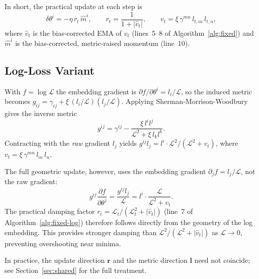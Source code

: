 \documentclass{article}
\newcommand{\loss}{\mathcal{L}}
\newcommand{\vecb}[1]{\boldsymbol{#1}}
\begin{document}
\noindent
In short, the practical update at each step is
\begin{equation}\label{eq:fixed-update}
    \delta\theta^i = -\eta\,r_t\,\hat{m}^i, \qquad
    r_t = \frac{1}{1 + |\hat{v}_t|}, \qquad
    v_t = \xi\,\gamma^{mn}\,l_{t,m}\,l_{t,n},
\end{equation}
where $\hat{v}_t$ is the bias-corrected EMA of $v_t$
(lines~5--8 of Algorithm~\ref{alg:fixed})
and $\hat{m}^i$ is the bias-corrected, metric-raised momentum (line~10).

\subsection{Log-Loss Variant}

\begin{tcolorbox}[colback=gray!8, colframe=gray!22, breakable, title=\textbf{Log-Loss Derivation Sketch}, coltitle=black]
    With $f = \log\loss$ the embedding gradient is $\partial f/\partial\theta^i = l_i/\loss$,
    so the induced metric becomes
    $g_{ij} = \gamma_{ij} + \xi\,(l_i/\loss)(l_j/\loss)$.
    Applying Sherman-Morrison-Woodbury gives the inverse metric
    $$
        g^{ij} = \gamma^{ij} - \frac{\xi\,l^i l^j}{\loss^2 + \xi\,l_k l^k}.
    $$
    Contracting with the \emph{raw} gradient $l_j$ yields
    $g^{ij}l_j = l^i \cdot \loss^2/(\loss^2 + v_t)$,
    where $v_t = \xi\,\gamma^{mn}\,l_m\,l_n$.

    \medskip\noindent
    The full geometric update, however, uses the embedding gradient
    $\partial_j f = l_j/\loss$, not the raw gradient:
    $$
        g^{ij}\frac{\partial f}{\partial\theta^j}
        = \frac{g^{ij}l_j}{\loss}
        = l^i \cdot \frac{\loss}{\loss^2 + v_t}.
    $$
    The practical damping factor $r_t = \loss_t/(\loss_t^2 + |\hat{v}_t|)$
    (line~7 of Algorithm~\ref{alg:fixed-log})
    therefore follows directly from the geometry of the log embedding.
    This provides stronger damping than $\loss^2/(\loss^2 + |\hat{v}_t|)$
    as $\loss\to 0$, preventing overshooting near minima.
\end{tcolorbox}

\noindent In practice, the update direction $\vecb{r}$ and the metric direction $\vecb{l}$
need not coincide; see Section~\ref{sec:shared} for the full treatment.
\end{document}
